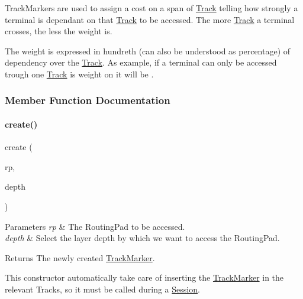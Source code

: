 Track\+Markers are used to assign a cost on a span of \mbox{\hyperlink{classKite_1_1Track}{Track}} telling how strongly a terminal is dependant on that \mbox{\hyperlink{classKite_1_1Track}{Track}} to be accessed. The more \mbox{\hyperlink{classKite_1_1Track}{Track}} a terminal crosses, the less the weight is.

The weight is expressed in hundreth (can also be understood as percentage) of dependency over the \mbox{\hyperlink{classKite_1_1Track}{Track}}. As example, if a terminal can only be accessed trough one \mbox{\hyperlink{classKite_1_1Track}{Track}} is weight on it will be {}. 

\subsubsection{Member Function Documentation}
\mbox{\label{classKite_1_1TrackMarker_ab44a3705a23cba53cf68357de5673c04}} 
\paragraph{\texorpdfstring{create()}{create()}}
{\footnotesize\ttfamily create (\begin{DoxyParamCaption}\item[{\textbf{ Routing\+Pad} $\ast$}]{rp,  }\item[{size\+\_\+t}]{depth }\end{DoxyParamCaption})\hspace{0.3cm}{\ttfamily [static]}}


\begin{DoxyParams}{Parameters}
{\em rp} & The Routing\+Pad to be accessed. \\
\hline
{\em depth} & Select the layer depth by which we want to access the Routing\+Pad. \\
\hline
\end{DoxyParams}
\begin{DoxyReturn}{Returns}
The newly created \mbox{\hyperlink{classKite_1_1TrackMarker}{Track\+Marker}}.
\end{DoxyReturn}
This constructor automatically take care of inserting the \mbox{\hyperlink{classKite_1_1TrackMarker}{Track\+Marker}} in the relevant Tracks, so it must be called during a \mbox{\hyperlink{classKite_1_1Session}{Session}}. \mbox{\label{classKite_1_1TrackMarker_a692492374623a5c6096b2c4a51190359}} 
